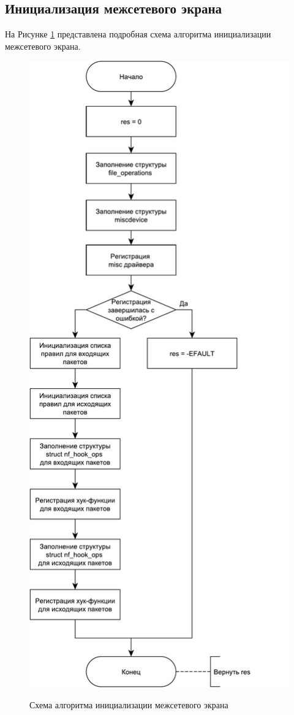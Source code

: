 \subsection{Инициализация межсетевого экрана}
На Рисунке \ref{fig3:image} представлена подробная схема алгоритма инициализации межсетевого экрана.
\begin{figure}[p]
	\begin{center}
		{\includegraphics[scale = 0.6]{img/init.pdf}}
		\caption{Схема алгоритма инициализации межсетевого экрана}
		\label{fig3:image}
	\end{center}
\end{figure}

